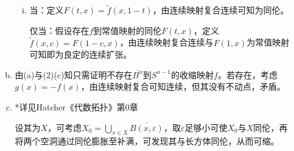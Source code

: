 \documentclass[a4paper,UTF8,fontset=windows]{ctexart}
\begin{document}
\begin{enumerate}[(1)]
\begin{enumerate}[(a)]
\begin{enumerate}[(i)]
    \item
    当：定义$F(t,x)=\tilde{f}(x,1-t)$，由连续映射复合连续可知为同伦。
    
    仅当：假设存在$f$到常值映射的同伦$F(t,x)$，定义$\tilde{f}(x,c)=F(1-c,x)$，由连续映射复合连续与$F(1,x)$为常值映射可知即为良定的连续扩张。
    \end{enumerate}
    
    \item
    由(a)与(2)(c)知只需证明不存在$\overline{B^n}$到$S^{n-1}$的收缩映射$f$。若存在，考虑$g(x)=-f(x)$，由连续映射复合可知连续，但其没有不动点，矛盾。
    
    \item
    *详见Hatcher《代数拓扑》第0章
    
    设其为$X$，可考虑$X_0=\bigcup_{x\in X}\overline{B(x,\varepsilon)}$，取$\varepsilon$足够小可使$X_0$与$X$同伦，再将两个空洞通过同伦膨胀至补满，可发现其与长方体同伦，从而可缩。
    \end{enumerate}
\end{enumerate}
\end{document}
